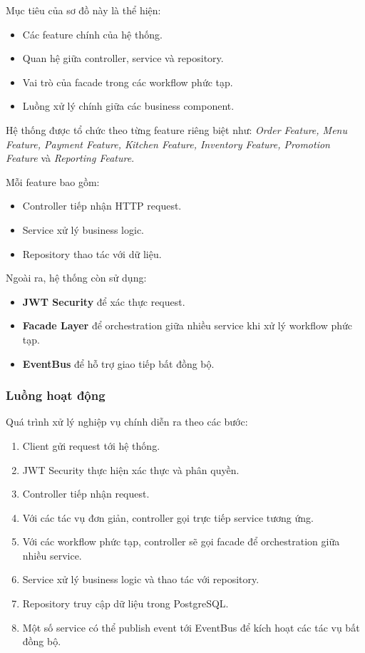 Mục tiêu của sơ đồ này là thể hiện:
\begin{itemize}
    \item Các feature chính của hệ thống.
    \item Quan hệ giữa controller, service và repository.
    \item Vai trò của facade trong các workflow phức tạp.
    \item Luồng xử lý chính giữa các business component.
\end{itemize}

Hệ thống được tổ chức theo từng feature riêng biệt như:
\textit{Order Feature, Menu Feature, Payment Feature, Kitchen Feature, Inventory Feature, Promotion Feature} và \textit{Reporting Feature}.

Mỗi feature bao gồm:
\begin{itemize}
    \item Controller tiếp nhận HTTP request.
    \item Service xử lý business logic.
    \item Repository thao tác với dữ liệu.
\end{itemize}

Ngoài ra, hệ thống còn sử dụng:
\begin{itemize}
    \item \textbf{JWT Security} để xác thực request.
    \item \textbf{Facade Layer} để orchestration giữa nhiều service khi xử lý workflow phức tạp.
    \item \textbf{EventBus} để hỗ trợ giao tiếp bất đồng bộ.
\end{itemize}

\subsubsection*{Luồng hoạt động}

Quá trình xử lý nghiệp vụ chính diễn ra theo các bước:

\begin{enumerate}
    \item Client gửi request tới hệ thống.
    
    \item JWT Security thực hiện xác thực và phân quyền.
    
    \item Controller tiếp nhận request.
    
    \item Với các tác vụ đơn giản, controller gọi trực tiếp service tương ứng.
    
    \item Với các workflow phức tạp, controller sẽ gọi facade để orchestration giữa nhiều service.
    
    \item Service xử lý business logic và thao tác với repository.
    
    \item Repository truy cập dữ liệu trong PostgreSQL.
    
    \item Một số service có thể publish event tới EventBus để kích hoạt các tác vụ bất đồng bộ.
\end{enumerate}


